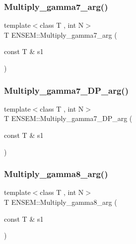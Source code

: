 \mbox{\label{namespaceENSEM_afef63b4334aa17ecf19ae4b2022d735f}} 
\subsubsection{\texorpdfstring{Multiply\_gamma7\_arg()}{Multiply\_gamma7\_arg()}}
{\footnotesize\ttfamily template$<$class T , int N$>$ \\
T E\+N\+S\+E\+M\+::\+Multiply\+\_\+gamma7\+\_\+arg (\begin{DoxyParamCaption}\item[{const T \&}]{s1 }\end{DoxyParamCaption})\hspace{0.3cm}{\ttfamily [inline]}}

\mbox{\label{namespaceENSEM_ad660e49ac580eb428198d8e36340ec63}} 
\subsubsection{\texorpdfstring{Multiply\_gamma7\_DP\_arg()}{Multiply\_gamma7\_DP\_arg()}}
{\footnotesize\ttfamily template$<$class T , int N$>$ \\
T E\+N\+S\+E\+M\+::\+Multiply\+\_\+gamma7\+\_\+\+D\+P\+\_\+arg (\begin{DoxyParamCaption}\item[{const T \&}]{s1 }\end{DoxyParamCaption})\hspace{0.3cm}{\ttfamily [inline]}}

\mbox{\label{namespaceENSEM_acafd9841429af6b6b6f2021fb85011f2}} 
\subsubsection{\texorpdfstring{Multiply\_gamma8\_arg()}{Multiply\_gamma8\_arg()}}
{\footnotesize\ttfamily template$<$class T , int N$>$ \\
T E\+N\+S\+E\+M\+::\+Multiply\+\_\+gamma8\+\_\+arg (\begin{DoxyParamCaption}\item[{const T \&}]{s1 }\end{DoxyParamCaption})\hspace{0.3cm}{\ttfamily [inline]}}

